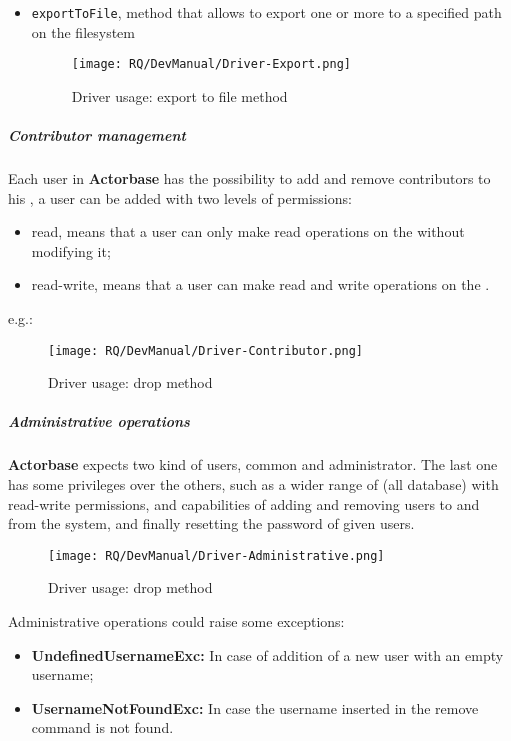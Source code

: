 \documentclass{scalatekids-article}
\begin{document}
\begin{itemize}
\item \verb=exportToFile=, method that allows to export one or more  to a specified path on the filesystem
  \begin{figure}[H]
    \begin{center}
      \texttt{[image: RQ/DevManual/Driver-Export.png]}
      \caption{Driver usage: export to file method}
    \end{center}
  \end{figure}
\end{itemize}

\subparagraph{Contributor management}

Each user in \textbf{Actorbase} has the possibility to add and remove contributors
to his , a user can be added with two levels of permissions:
\begin{itemize}
\item read, means that a user can only make read operations on the  without modifying it;
\item read-write, means that a user can make read and write operations on the .
\end{itemize}
e.g.:
\begin{figure}[H]
  \begin{center}
    \texttt{[image: RQ/DevManual/Driver-Contributor.png]}
    \caption{Driver usage: drop method}
  \end{center}
\end{figure}

\subparagraph{Administrative operations}

\textbf{Actorbase} expects two kind of users, common and administrator. The last one has
some privileges over the others, such as a wider range of  (all
database) with read-write permissions, and capabilities of adding and removing
users to and from the system, and finally resetting the password of given users.
\begin{figure}[H]
  \begin{center}
    \texttt{[image: RQ/DevManual/Driver-Administrative.png]}
    \caption{Driver usage: drop method}
  \end{center}
\end{figure}
Administrative operations could raise some exceptions:
\begin{itemize}
\item \textbf{UndefinedUsernameExc:} In case of addition of a new user with an empty username;
\item \textbf{UsernameNotFoundExc:} In case the username inserted in the remove command is not found.
\end{itemize}
\end{document}
